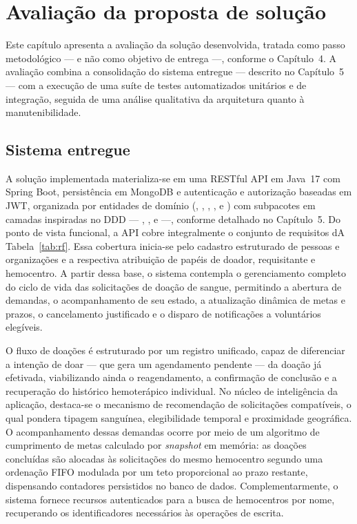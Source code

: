 \chapter{Avaliação da proposta de solução}

Este capítulo apresenta a avaliação da solução desenvolvida, tratada como passo metodológico --- e não como objetivo de entrega ---, conforme o Capítulo~4. A avaliação combina a consolidação do sistema entregue --- descrito no Capítulo~5 --- com a execução de uma suíte de testes automatizados unitários e de integração, seguida de uma análise qualitativa da arquitetura quanto à manutenibilidade.

\section{Sistema entregue}

A solução implementada materializa-se em uma RESTful API em Java~17 com Spring Boot, persistência em MongoDB e autenticação e autorização baseadas em JWT, organizada por entidades de domínio (, , , ,  e ) com subpacotes em camadas inspiradas no DDD --- , ,  e  ---, conforme detalhado no Capítulo~5. Do ponto de vista funcional, a API cobre integralmente o conjunto de requisitos dA Tabela~\ref{tab:rf}. Essa cobertura inicia-se pelo cadastro estruturado de pessoas e organizações e a respectiva atribuição de papéis de doador, requisitante e hemocentro. A partir dessa base, o sistema contempla o gerenciamento completo do ciclo de vida das solicitações de doação de sangue, permitindo a abertura de demandas, o acompanhamento de seu estado, a atualização dinâmica de metas e prazos, o cancelamento justificado e o disparo de notificações a voluntários elegíveis.

O fluxo de doações é estruturado por um registro unificado, capaz de diferenciar a intenção de doar --- que gera um agendamento pendente --- da doação já efetivada, viabilizando ainda o reagendamento, a confirmação de conclusão e a recuperação do histórico hemoterápico individual. No núcleo de inteligência da aplicação, destaca-se o mecanismo de recomendação de solicitações compatíveis, o qual pondera tipagem sanguínea, elegibilidade temporal e proximidade geográfica. O acompanhamento dessas demandas ocorre por meio de um algoritmo de cumprimento de metas calculado por \textit{snapshot} em memória: as doações concluídas são alocadas às solicitações do mesmo hemocentro segundo uma ordenação FIFO modulada por um teto proporcional ao prazo restante, dispensando contadores persistidos no banco de dados. Complementarmente, o sistema fornece recursos autenticados para a busca de hemocentros por nome, recuperando os identificadores necessários às operações de escrita.

